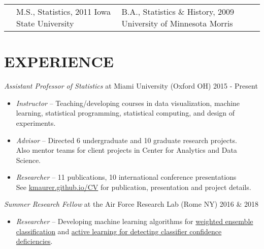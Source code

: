 \documentclass[margin, 10pt]{res}\usepackage[]{graphicx}\usepackage[]{color}
\begin{document}
\begin{resume}
\begin{tabular}{p{3.75cm}p{3.75cm}p{5.5cm}}
&

M.S., Statistics, 2011
\newline Iowa State University

&

\newline B.A., Statistics \& History, 2009  
\newline University of Minnesota Morris
\end{tabular}

  
\section{EXPERIENCE}

{\sl Assistant Professor of Statistics} at Miami University (Oxford OH) \hfill 2015 - Present
\begin{itemize} \itemsep -2pt %
\item {\it Instructor} -- Teaching/developing courses in data visualization, machine learning, statistical programming, statistical computing, and design of experiments.
\item {\it Advisor} -- Directed 6 undergraduate and 10 graduate research projects. \\Also mentor teams for client projects in Center for Analytics and Data Science. 
\item {\it Researcher} -- 11 publications, 10 international conference presentations \\ See \href{https://kmaurer.github.io/CV}{kmaurer.github.io/CV} for publication, presentation and project details.
\end{itemize}
{\sl Summer Research Fellow} at the Air Force Research Lab (Rome NY) \hfill  2016 \& 2018 

\begin{itemize} \itemsep -2pt %
\item {\it Researcher} -- Developing machine learning algorithms for \href{http://kmaurer.github.io/documents/conferences/JSM2017.pdf}{weighted ensemble classification} and \href{https://arxiv.org/pdf/1810.05571.pdf}{active learning for detecting classifier confidence deficiencies}. 
\end{itemize}
% 


\end{resume}
\end{document}
